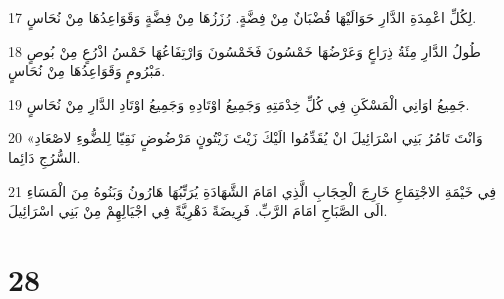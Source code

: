 \par 17 لِكُلِّ اعْمِدَةِ الدَّارِ حَوَالَيْهَا قُضْبَانٌ مِنْ فِضَّةٍ. رُزَزُهَا مِنْ فِضَّةٍ وَقَوَاعِدُهَا مِنْ نُحَاسٍ.
\par 18 طُولُ الدَّارِ مِئَةُ ذِرَاعٍ وَعَرْضُهَا خَمْسُونَ فَخَمْسُونَ وَارْتِفَاعُهَا خَمْسُ اذْرُعٍ مِنْ بُوصٍ مَبْرُومٍ وَقَوَاعِدُهَا مِنْ نُحَاسٍ.
\par 19 جَمِيعُ اوَانِي الْمَسْكَنِ فِي كُلِّ خِدْمَتِهِ وَجَمِيعُ اوْتَادِهِ وَجَمِيعُ اوْتَادِ الدَّارِ مِنْ نُحَاسٍ.
\par 20 «وَانْتَ تَامُرُ بَنِي اسْرَائِيلَ انْ يُقَدِّمُوا الَيْكَ زَيْتَ زَيْتُونٍ مَرْضُوضٍ نَقِيّا لِلضُّوءِ لاصْعَادِ السُّرُجِ دَائِما.
\par 21 فِي خَيْمَةِ الاجْتِمَاعِ خَارِجَ الْحِجَابِ الَّذِي امَامَ الشَّهَادَةِ يُرَتِّبُهَا هَارُونُ وَبَنُوهُ مِنَ الْمَسَاءِ الَى الصَّبَاحِ امَامَ الرَّبِّ. فَرِيضَةً دَهْرِيَّةً فِي اجْيَالِهِمْ مِنْ بَنِي اسْرَائِيلَ.

\chapter{28}

